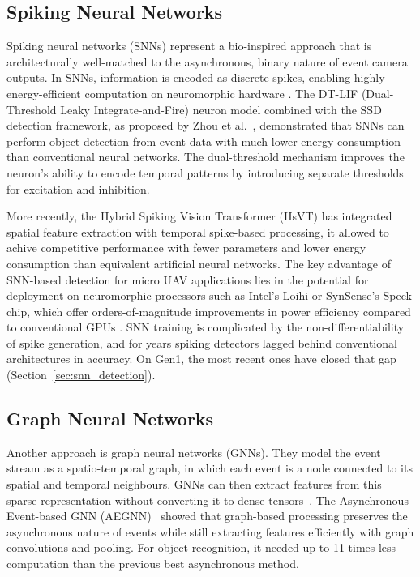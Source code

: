 \documentclass[11pt, a4paper]{report}
\begin{document}
\subsection{Spiking Neural Networks}
Spiking neural networks (SNNs) represent a bio-inspired approach that is architecturally well-matched to the asynchronous, binary nature of event camera outputs. In SNNs, information is encoded as discrete spikes, enabling highly energy-efficient computation on neuromorphic hardware \cite{roy2019towards}. The DT-LIF (Dual-Threshold Leaky Integrate-and-Fire) neuron model combined with the SSD detection framework, as proposed by Zhou et al.~\cite{zhou2023dtlif}, demonstrated that SNNs can perform object detection from event data with much lower energy consumption than conventional neural networks. The dual-threshold mechanism improves the neuron's ability to encode temporal patterns by introducing separate thresholds for excitation and inhibition.

More recently, the Hybrid Spiking Vision Transformer (HsVT) \cite{xu2025hybrid} has integrated spatial feature extraction with temporal spike-based processing, it allowed to achive competitive performance with fewer parameters and lower energy consumption than equivalent artificial neural networks. The key advantage of SNN-based detection for micro UAV applications lies in the potential for deployment on neuromorphic processors such as Intel's Loihi or SynSense's Speck chip, which offer orders-of-magnitude improvements in power efficiency compared to conventional GPUs \cite{synsense2026speck}. SNN training is complicated by the non-differentiability of spike generation, and for years spiking detectors lagged behind conventional architectures in accuracy. On Gen1, the most recent ones have closed that gap (Section~\ref{sec:snn_detection}).

\subsection{Graph Neural Networks}
Another approach is graph neural networks (GNNs). They model the event stream as a spatio-temporal graph, in
which each event is a node connected to its spatial and temporal neighbours. GNNs can then extract features
from this sparse representation without converting it to dense tensors~\cite{bi2019graph}. The Asynchronous
Event-based GNN (AEGNN)~\cite{schaefer2022aegnn} showed that graph-based processing preserves the
asynchronous nature of events while still extracting features efficiently with graph convolutions and
pooling. For object recognition, it needed up to 11 times less computation than the previous best
asynchronous method.
\end{document}
